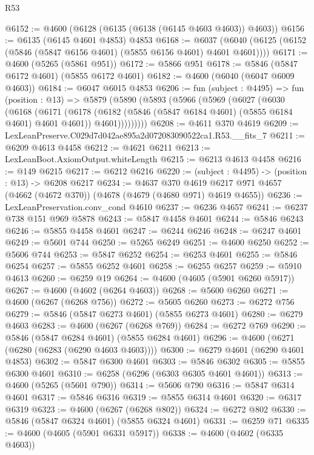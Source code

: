 \begin{lexlean}{R53}
\begin{coremodule}
@6152 := @4600 (@6128 (@6135 (@6138 (@6145 @4603 @4603)) @4603))
@6156 := @6135 (@6145 @4601 @4853) @4853
@6168 := @6037 (@6040 (@6125 (@6152 (@5846 (@5847 @6156 @4601) (@5855 @6156 @4601) @4601 @4601))))
@6171 := @4600 (@5265 (@5861 @951))
@6172 := @5866 @951
@6178 := @5846 (@5847 @6172 @4601) (@5855 @6172 @4601)
@6182 := @4600 (@6040 (@6047 @6009 @4603))
@6184 := @6047 @6015 @4853
@6206 := fun (subject : @4495) =>
  fun (position : @13) =>
  @5879
    (@5890
      (@5893
        (@5966
          (@5969
            (@6027
              (@6030
                (@6168
                  (@6171
                    (@6178
                      (@6182 (@5846 (@5847 @6184 @4601) (@5855 @6184 @4601) @4601 @4601))
                      @4601)))))))))
@6208 := @4611 @370 @4619
@6209 := LexLeanPreserve.C029d7d042ae895a2d072083090522ca1.R53.__fits_7
@6211 := @6209 @4613 @4458
@6212 := @4621 @6211
@6213 := LexLeanBoot.AxiomOutput.whiteLength
@6215 := @6213 @4613 @4458
@6216 := @149 @6215
@6217 := @6212 @6216
@6220 := (subject : @4495) -> (position : @13) -> @6208 @6217
@6234 := @4637
    @370
    @4619
    @6217
    @971
    @4657
    (@4662 (@4672 @370))
    (@4678 (@4679 (@4680 @971) @4619 @4655))
@6236 := LexLeanPreservation.conv_cond @4610
@6237 := @6236 @4657
@6241 := @6237 @738 @151 @969 @5878
@6243 := @5847 @4458 @4601
@6244 := @5846 @6243
@6246 := @5855 @4458 @4601
@6247 := @6244 @6246
@6248 := @6247 @4601
@6249 := @5601 @744
@6250 := @5265 @6249
@6251 := @4600 @6250
@6252 := @5606 @744
@6253 := @5847 @6252
@6254 := @6253 @4601
@6255 := @5846 @6254
@6257 := @5855 @6252 @4601
@6258 := @6255 @6257
@6259 := @5910 @4613
@6260 := @6259 @19
@6264 := @4600 (@4605 (@5901 @6260 @5917))
@6267 := @4600 (@4602 (@6264 @4603))
@6268 := @5600 @6260
@6271 := @4600 (@6267 (@6268 @756))
@6272 := @5605 @6260
@6273 := @6272 @756
@6279 := @5846 (@5847 @6273 @4601) (@5855 @6273 @4601)
@6280 := @6279 @4603
@6283 := @4600 (@6267 (@6268 @769))
@6284 := @6272 @769
@6290 := @5846 (@5847 @6284 @4601) (@5855 @6284 @4601)
@6296 := @4600 (@6271 (@6280 (@6283 (@6290 @4603 @4603))))
@6300 := @6279 @4601 (@6290 @4601 @4853)
@6302 := @5847 @6300 @4601
@6303 := @5846 @6302
@6305 := @5855 @6300 @4601
@6310 := @6258 (@6296 (@6303 @6305 @4601 @4601))
@6313 := @4600 (@5265 (@5601 @790))
@6314 := @5606 @790
@6316 := @5847 @6314 @4601
@6317 := @5846 @6316
@6319 := @5855 @6314 @4601
@6320 := @6317 @6319
@6323 := @4600 (@6267 (@6268 @802))
@6324 := @6272 @802
@6330 := @5846 (@5847 @6324 @4601) (@5855 @6324 @4601)
@6331 := @6259 @71
@6335 := @4600 (@4605 (@5901 @6331 @5917))
@6338 := @4600 (@4602 (@6335 @4603))

\end{coremodule}
\end{lexlean}

